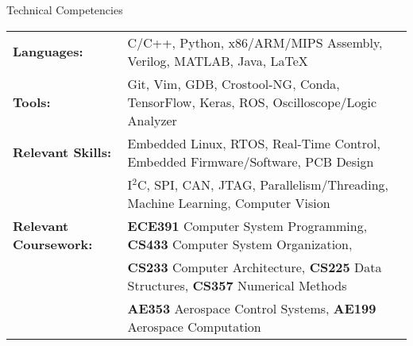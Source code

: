 \documentclass{resume} %
\begin{document}

    \begin{rSection} {Technical Competencies}

        \begin{tabular}{ @{} >{\bfseries}l @{\hspace{2ex}} l }

        Languages: & C/C++, Python, x86/ARM/MIPS Assembly, Verilog, MATLAB, Java, LaTeX \\
        Tools: & Git, Vim, GDB, Crostool-NG, Conda, TensorFlow, Keras, ROS, Oscilloscope/Logic Analyzer \\
        Relevant Skills: & Embedded Linux, RTOS, Real-Time Control, Embedded Firmware/Software, PCB Design \\ & I$^2$C, SPI, CAN, JTAG, Parallelism/Threading, Machine Learning, Computer Vision \\
		Relevant Coursework: & \textbf{ECE391} Computer System Programming, \textbf{CS433} Computer System Organization,\\ & \textbf{CS233} Computer Architecture, \textbf{CS225} Data Structures, \textbf{CS357} Numerical Methods \\ & \textbf{AE353} Aerospace Control Systems, \textbf{AE199} Aerospace Computation

        \end{tabular}

    \end{rSection}

\end{document}
